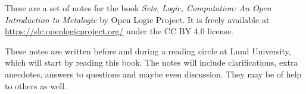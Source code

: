 These are a set of notes for the book {\it Sets, Logic, Computation: An Open Introduction to Metalogic} by Open Logic Project. It is freely available at \\ \url{https://slc.openlogicproject.org/} under the CC BY 4.0 license. 

These notes are written before and during a reading circle at Lund University, which will start by reading this book. The notes will include clarifications, extra anecdotes, answers to questions and maybe even discussion. They may be of help to others as well. 